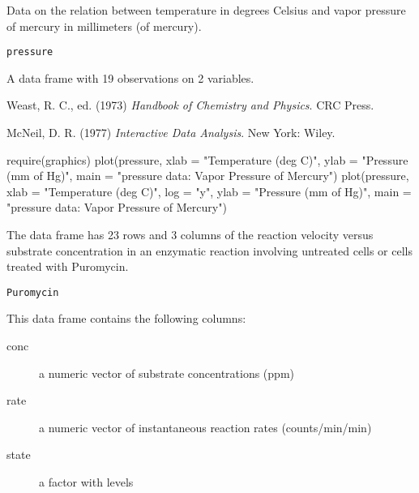 %
\begin{Description}\relax
Data on the relation between temperature in degrees Celsius and vapor
pressure of mercury in millimeters (of mercury).
\end{Description}
%
\begin{Usage}
\begin{verbatim}
pressure
\end{verbatim}
\end{Usage}
%
\begin{Format}
A data frame with 19 observations on 2 variables.

\end{Format}
%
\begin{Source}\relax
Weast, R. C., ed. (1973)
\emph{Handbook of Chemistry and Physics}.
CRC Press.
\end{Source}
%
\begin{References}\relax
McNeil, D. R. (1977)
\emph{Interactive Data Analysis}.
New York: Wiley.
\end{References}
%
\begin{Examples}
\begin{ExampleCode}
require(graphics)
plot(pressure, xlab = "Temperature (deg C)",
     ylab = "Pressure (mm of Hg)",
     main = "pressure data: Vapor Pressure of Mercury")
plot(pressure, xlab = "Temperature (deg C)",  log = "y",
     ylab = "Pressure (mm of Hg)",
     main = "pressure data: Vapor Pressure of Mercury")
\end{ExampleCode}
\end{Examples}
%
\begin{Description}\relax
The  data frame has 23 rows and 3 columns of the
reaction velocity versus substrate concentration in an enzymatic
reaction involving untreated cells or cells treated with Puromycin.
\end{Description}
%
\begin{Usage}
\begin{verbatim}
Puromycin
\end{verbatim}
\end{Usage}
%
\begin{Format}
This data frame contains the following columns:
\begin{description}

\item[conc] 
a numeric vector of substrate concentrations (ppm)

\item[rate] 
a numeric vector of instantaneous reaction rates (counts/min/min)

\item[state] 
a factor with levels


\end{description}

\end{Format}
